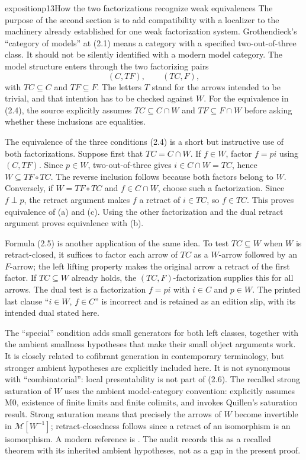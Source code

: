\begin{dcomment}{exposition}{p13}{How the two factorizations recognize weak equivalences}
The purpose of the second section is to add compatibility with a localizer to the machinery already established for one weak factorization system. Grothendieck's ``category of models'' at (2.1) means a category with a specified two-out-of-three class. It should not be silently identified with a modern model category. The model structure enters through the two factorizing pairs
\[
 (C,TF),\qquad (TC,F),
\]
with $TC\subseteq C$ and $TF\subseteq F$. The letters $T$ stand for the arrows intended to be trivial, and that intention has to be checked against $W$. For the equivalence in (2.4), the source explicitly assumes $TC\subseteq C\cap W$ and $TF\subseteq F\cap W$ before asking whether these inclusions are equalities.

The equivalence of the three conditions (2.4) is a short but instructive use of both factorizations. Suppose first that $TC=C\cap W$. If $f\in W$, factor $f=pi$ using $(C,TF)$. Since $p\in W$, two-out-of-three gives $i\in C\cap W=TC$, hence $W\subseteq TF\circ TC$. The reverse inclusion follows because both factors belong to $W$. Conversely, if $W=TF\circ TC$ and $f\in C\cap W$, choose such a factorization. Since $f\perp p$, the retract argument makes $f$ a retract of $i\in TC$, so $f\in TC$. This proves equivalence of (a) and (c). Using the other factorization and the dual retract argument proves equivalence with (b).

Formula (2.5) is another application of the same idea. To test $TC\subseteq W$ when $W$ is retract-closed, it suffices to factor each arrow of $TC$ as a $W$-arrow followed by an $F$-arrow; the left lifting property makes the original arrow a retract of the first factor. If $TC\subseteq W$ already holds, the $(TC,F)$-factorization supplies this for all arrows. The dual test is a factorization $f=pi$ with $i\in C$ and $p\in W$. The printed last clause ``$i\in W$, $f\in C$'' is incorrect and is retained as an edition slip, with its intended dual stated here.

The ``special'' condition adds small generators for both left classes, together with the ambient smallness hypotheses that make their small object arguments work. It is closely related to cofibrant generation in contemporary terminology, but stronger ambient hypotheses are explicitly included here. It is not synonymous with ``combinatorial'': local presentability is not part of (2.6). The recalled strong saturation of $W$ uses the ambient model-category convention: \citet[Chapter~XIII, \S3, manuscript pp.~27--29]{Grothendieck1990XIII} explicitly assumes M0, existence of finite limits and finite colimits, and invokes Quillen's saturation result. Strong saturation means that precisely the arrows of $W$ become invertible in $\mathcal M[W^{-1}]$; retract-closedness follows since a retract of an isomorphism is an isomorphism. A modern reference is \citet[Theorem~1.2.10(iv)]{Hovey1999}. The audit records this as a recalled theorem with its inherited ambient hypotheses, not as a gap in the present proof.
\end{dcomment}

